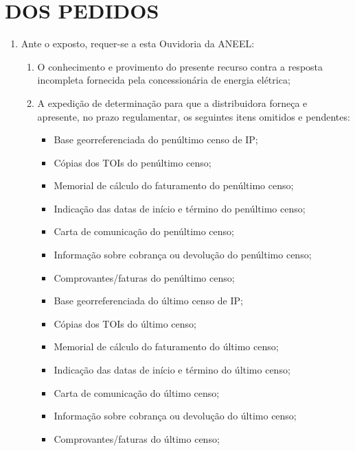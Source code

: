 \section{DOS PEDIDOS}

\begin{enumerate}[resume]
\item Ante o exposto, requer-se a esta Ouvidoria da ANEEL:
    \begin{enumerate}
    \item O conhecimento e provimento do presente recurso contra a resposta incompleta fornecida pela concessionária de energia elétrica;
    \item A expedição de determinação para que a distribuidora forneça e apresente, no prazo regulamentar, os seguintes itens omitidos e pendentes:
    \begin{itemize}
        \ifItemPenultimoBaseGeorreferenciada\else\item Base georreferenciada do penúltimo censo de IP;\fi
        \ifItemPenultimoTOI\else\item Cópias dos TOIs do penúltimo censo;\fi
        \ifItemPenultimoMemorialCalculo\else\item Memorial de cálculo do faturamento do penúltimo censo;\fi
        \ifItemPenultimoDatasCenso\else\item Indicação das datas de início e término do penúltimo censo;\fi
        \ifItemPenultimoCartaComunicacao\else\item Carta de comunicação do penúltimo censo;\fi
        \ifItemPenultimoCobrancaDevolucao\else\item Informação sobre cobrança ou devolução do penúltimo censo;\fi
        \ifItemPenultimoComprovantes\else\item Comprovantes/faturas do penúltimo censo;\fi

        \ifItemUltimoBaseGeorreferenciada\else\item Base georreferenciada do último censo de IP;\fi
        \ifItemUltimoTOI\else\item Cópias dos TOIs do último censo;\fi
        \ifItemUltimoMemorialCalculo\else\item Memorial de cálculo do faturamento do último censo;\fi
        \ifItemUltimoDatasCenso\else\item Indicação das datas de início e término do último censo;\fi
        \ifItemUltimoCartaComunicacao\else\item Carta de comunicação do último censo;\fi
        \ifItemUltimoCobrancaDevolucao\else\item Informação sobre cobrança ou devolução do último censo;\fi
        \ifItemUltimoComprovantes\else\item Comprovantes/faturas do último censo;\fi


\end{itemize}
\end{enumerate}
\end{enumerate}

